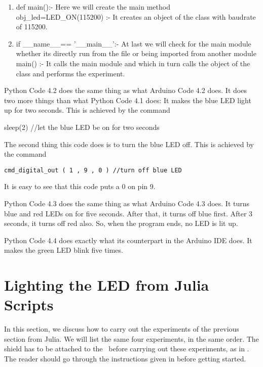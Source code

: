 \begin{enumerate}
\item def main():- Here we will create the main method \\
    obj\_led=LED\_ON(115200) :- It creates an object of the class with baudrate of 115200.
\item if \_\_name\_\_== '\_\_main\_\_':- At last we will check for the main module 
whether its directly run from the file or being imported from another module \\
main() :- It calls the main module and which in turn calls the object of the 
class and performs the experiment.
\end{enumerate}
Python Code 4.2 does the same thing as what Arduino Code 4.2 does. It does
two more things than what Python Code 4.1 does: It makes the blue LED light
up for two seconds. This is achieved by the command

sleep(2)  //let the blue LED be on for two seconds

The second thing this code does is to turn the blue LED off. This is achieved
by the command

\begin{lstlisting}[style=nonumbers]
     cmd_digital_out ( 1 , 9 , 0 ) //turn off blue LED
  \end{lstlisting}


It is easy to see that this code puts a 0 on pin 9.

Python Code 4.3 does the same thing as what Arduino Code 4.3 does. It turns
blue and red LEDs on for five seconds. After that, it turns off blue first. After
3 seconds, it turns off red also. So, when the program ends, no LED is lit up.

Python Code 4.4 does exactly what its counterpart in the Arduino IDE does.
It makes the green LED blink five times. 


\section{Lighting the LED from Julia Scripts}
\label{sec:light-julia}
In this section, we discuss how to carry out the experiments of the
previous section from Julia.  We will list the same four experiments,
in the same order.  The shield has to be attached to the \arduino\
before carrying out these experiments, as in .
The reader should go through the instructions given in
 before getting started.

